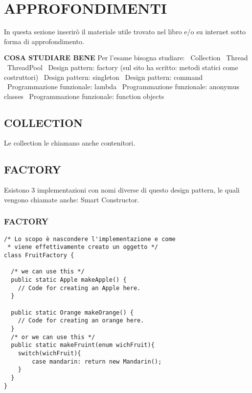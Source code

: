 

\newpage
\section{APPROFONDIMENTI}
In questa sezione inserirò il materiale utile trovato nel libro e/o su internet sotto forma di approfondimento. 


\noindent \textbf{COSA STUDIARE BENE} \newline
Per l'esame bisogna studiare: \newline
\textbullet\ Collection \newline
\textbullet\ Thread \newline
\textbullet\ ThreadPool \newline
\textbullet\ Design pattern: factory (sul sito ha scritto: metodi statici come costruttori)\newline
\textbullet\ Design pattern: singleton \newline
\textbullet\ Design pattern: command \newline
\textbullet\ Programmazione funzionale: lambda \newline
\textbullet\ Programmazione funzionale: anonymus classes \newline
\textbullet\ Programmazione funzionale: function objects \newline


\subsection{COLLECTION}
\noindent Le collection le chiamano anche contenitori.


\subsection{FACTORY}
Esistono 3 implementazioni con nomi diverse di questo design pattern, le quali vengono chiamate anche: Smart Constructor. \newline
\subsubsection{FACTORY}
\begin{lstlisting}
/* Lo scopo è nascondere l'implementazione e come
 * viene effettivamente creato un oggetto */
class FruitFactory {

  /* we can use this */
  public static Apple makeApple() {
    // Code for creating an Apple here.
  }

  public static Orange makeOrange() {
    // Code for creating an orange here.
  }
  /* or we can use this */
  public static makeFruint(enum wichFruit){
  	switch(wichFruit){
  		case mandarin: return new Mandarin();
  	}
  }
}
\end{lstlisting}
